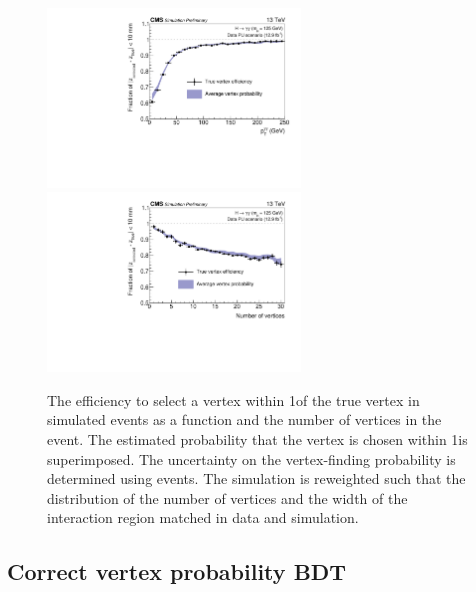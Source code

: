 \begin{figure}[h]
\centering
\includegraphics[width=0.6\textwidth]{recoFigures/Pt2016PU125BSReweighted12.pdf}
\includegraphics[width=0.6\textwidth]{recoFigures/Nvtx2016PU125BSReweighted12.pdf}
\caption{The efficiency to select a vertex within 1\cm of the true vertex in simulated \Hgg events as a function \pT and the number of vertices in the event. The estimated probability that the vertex is chosen within 1\cm is superimposed. The uncertainty on the vertex-finding probability is determined using \Zmumu events. The simulation is reweighted such that the distribution of the number of vertices and the width of the interaction region matched in data and simulation. }
\label{fig:reco:vtxidbdt_eff}
\end{figure}

\subsection{Correct vertex probability BDT}
\label{reco:sec:vtx_prob}

